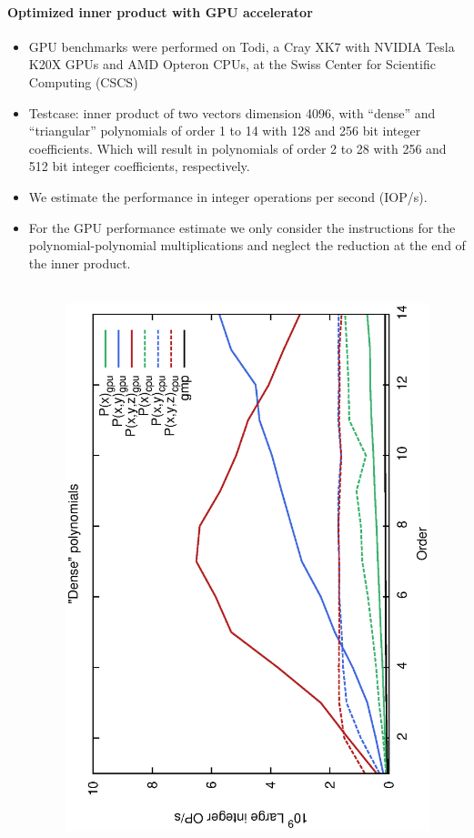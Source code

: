 \documentclass[oribibl]{llncs2e/llncs}
\begin{document}
\paragraph{Optimized inner product with GPU accelerator}
\begin{itemize}
\item GPU benchmarks were performed on Todi, a Cray XK7 with NVIDIA Tesla K20X GPUs and AMD Opteron CPUs, at the Swiss Center for Scientific Computing (CSCS)
\item Testcase: inner product of two vectors dimension 4096, with ``dense'' and
``triangular'' polynomials of order 1 to 14 with 128 and 256 bit integer
coefficients. Which will result in polynomials of order 2 to 28 with 256 and 512 bit integer coefficients, respectively.
\item We estimate the performance in integer operations per second (IOP/s).
\item For the GPU performance estimate we only consider the instructions for the polynomial-polynomial multiplications and neglect the reduction at the end of the inner product.
\begin{figure}[t!]
    \begin{center}
    \mbox{
        \hspace{-0.5cm}
        \includegraphics[scale=0.37, angle=-90]{ME128.eps} 
}
\end{center}
\end{figure}
\end{itemize}
\end{document}
